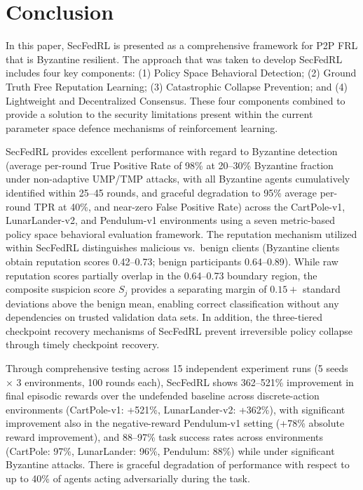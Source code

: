 \documentclass[12pt,a4paper]{article}
\begin{document}
\section{Conclusion}
\label{sec:conclusion}

In this paper, SecFedRL is presented as a comprehensive framework for P2P FRL that is
Byzantine resilient. The approach that was taken to develop SecFedRL includes four key
components: (1) Policy Space Behavioral Detection; (2) Ground Truth Free Reputation
Learning; (3) Catastrophic Collapse Prevention; and (4) Lightweight and Decentralized
Consensus. These four components combined to provide a solution to the
security limitations present within the current parameter space defence mechanisms of
reinforcement learning.

SecFedRL provides excellent performance with regard to Byzantine detection (average
per-round True Positive Rate of 98\% at 20--30\% Byzantine fraction under non-adaptive
UMP/TMP attacks, with all Byzantine agents cumulatively identified within 25--45 rounds,
and graceful degradation to 95\% average per-round
TPR at 40\%, and near-zero False Positive Rate) across the CartPole-v1,
LunarLander-v2, and Pendulum-v1 environments using a seven metric-based policy space
behavioral evaluation framework. The reputation mechanism utilized within SecFedRL
distinguishes malicious vs.\ benign clients (Byzantine clients obtain reputation
scores 0.42--0.73; benign participants 0.64--0.89). While raw reputation scores
partially overlap in the 0.64--0.73 boundary region, the composite suspicion score
$S_j$ provides a separating margin of $0.15+$ standard deviations above the benign
mean, enabling correct classification without any dependencies on trusted validation
data sets. In addition, the three-tiered checkpoint recovery mechanisms of SecFedRL
prevent irreversible policy collapse through timely checkpoint recovery.

Through comprehensive testing across 15 independent experiment runs (5 seeds $\times$
3 environments, 100 rounds each), SecFedRL shows 362--521\% improvement in final
episodic rewards over the undefended baseline across discrete-action environments
(CartPole-v1: +521\%, LunarLander-v2: +362\%), with significant improvement also in
the negative-reward Pendulum-v1 setting (+78\% absolute reward improvement), and
88--97\% task success rates across environments (CartPole: 97\%, LunarLander: 96\%,
Pendulum: 88\%) while under significant Byzantine attacks. There is graceful
degradation of performance with respect to up to 40\% of agents acting adversarially
during the task.
\end{document}
